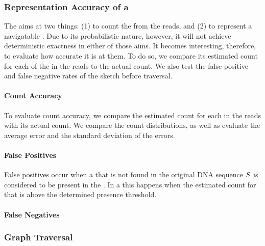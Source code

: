 
\subsubsection{Representation Accuracy of a \dBCM}

The \dBCM aims at two things: (1) to count the  from the reads, and (2) to represent a navigatable \dBG. Due to its probabilistic nature, however, it will not achieve deterministic exactness in either of those aims. It becomes interesting, therefore, to evaluate how accurate it is at them. To do so, we compare its estimated count for each of the  in the reads to the  actual count. We also test the false positive and false negative rates of the sketch before traversal.

\paragraph{Count Accuracy} To evaluate count accuracy, we compare the estimated count for each \kmer in the reads with its actual count. We compare the count distributions, as well as evaluate  the average error and the standard deviation of the errors.

\paragraph{False Positives} False positives occur when a \kmer that is not found in the original DNA sequence $\strname{S}$ is considered to be present in the \dBG. In a \dBCM this happens when the estimated count for that \kmer is above the determined presence threshold.

\paragraph{False Negatives}

\subsubsection{Graph Traversal}

